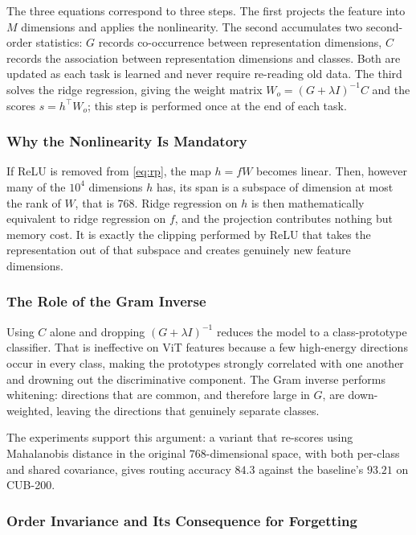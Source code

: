 \documentclass[11pt,a4paper]{article}
\begin{document}
The three equations correspond to three steps. The first projects the feature
into $M$ dimensions and applies the nonlinearity. The second accumulates two
second-order statistics: $G$ records co-occurrence between representation
dimensions, $C$ records the association between representation dimensions and
classes. Both are updated as each task is learned and never require re-reading
old data. The third solves the ridge regression, giving the weight matrix
$W_o = (G + \lambda I)^{-1} C$ and the scores $s = h^{\top} W_o$; this step is
performed once at the end of each task.

\subsubsection{Why the Nonlinearity Is Mandatory}

If ReLU is removed from \eqref{eq:rp}, the map $h = fW$ becomes linear. Then,
however many of the $10^4$ dimensions $h$ has, its span is a subspace of
dimension at most the rank of $W$, that is $768$. Ridge regression on $h$ is then
mathematically equivalent to ridge regression on $f$, and the projection
contributes nothing but memory cost. It is exactly the clipping performed by
ReLU that takes the representation out of that subspace and creates genuinely
new feature dimensions.

\subsubsection{The Role of the Gram Inverse}

Using $C$ alone and dropping $(G + \lambda I)^{-1}$ reduces the model to a
class-prototype classifier. That is ineffective on ViT features because a few
high-energy directions occur in every class, making the prototypes strongly
correlated with one another and drowning out the discriminative component. The
Gram inverse performs whitening: directions that are common, and therefore large
in $G$, are down-weighted, leaving the directions that genuinely separate
classes.

The experiments support this argument: a variant that re-scores using
Mahalanobis distance in the original $768$-dimensional space, with both
per-class and shared covariance, gives routing accuracy $84.3$ against the
baseline's $93.21$ on CUB-200.

\subsubsection{Order Invariance and Its Consequence for Forgetting}
\label{sec:order}
\end{document}
